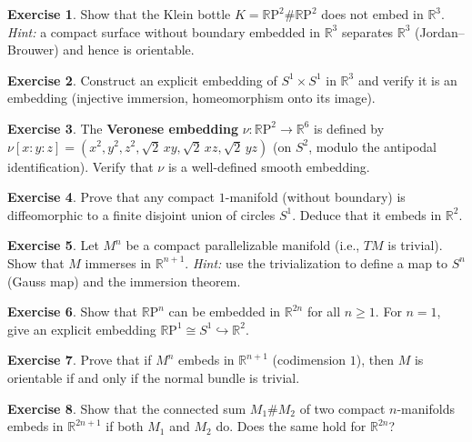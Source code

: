 \documentclass[12pt,a4paper,openany]{book}
\theoremstyle{definition}
\newtheorem{exercise}{Exercise}[chapter]
\theoremstyle{remark}
\newcommand{\R}{\mathbb{R}}
\newcommand{\RP}{\mathbb{R}\mathrm{P}}
\begin{document}
\begin{exercise}\label{exo:whitney-1}
Show that the Klein bottle $K = \RP^2 \# \RP^2$ does not embed in $\R^3$.
\emph{Hint:} a compact surface without boundary embedded in $\R^3$
separates $\R^3$ (Jordan--Brouwer) and hence is orientable.
\end{exercise}

\begin{exercise}\label{exo:whitney-2}
Construct an explicit embedding of $S^1 \times S^1$ in $\R^3$ and
verify it is an embedding (injective immersion, homeomorphism onto
its image).
\end{exercise}

\begin{exercise}\label{exo:whitney-3}
The \textbf{Veronese embedding} $\nu\colon \RP^2 \to \R^6$ is defined by
$\nu[x:y:z] = (x^2,y^2,z^2,\sqrt{2}\,xy,\sqrt{2}\,xz,\sqrt{2}\,yz)$
(on $S^2$, modulo the antipodal identification). Verify that $\nu$ is a
well-defined smooth embedding.
\end{exercise}

\begin{exercise}\label{exo:whitney-4}
Prove that any compact $1$-manifold (without boundary) is diffeomorphic
to a finite disjoint union of circles $S^1$. Deduce that it embeds in $\R^2$.
\end{exercise}

\begin{exercise}\label{exo:whitney-5}
Let $M^n$ be a compact parallelizable manifold (i.e., $TM$ is trivial).
Show that $M$ immerses in $\R^{n+1}$.
\emph{Hint:} use the trivialization to define a map to $S^n$
(Gauss map) and the immersion theorem.
\end{exercise}

\begin{exercise}\label{exo:whitney-6}
Show that $\RP^n$ can be embedded in $\R^{2n}$ for all $n\ge 1$.
For $n=1$, give an explicit embedding $\RP^1 \cong S^1 \hookrightarrow\R^2$.
\end{exercise}

\begin{exercise}\label{exo:whitney-7}
Prove that if $M^n$ embeds in $\R^{n+1}$ (codimension $1$), then $M$
is orientable if and only if the normal bundle is trivial.
\end{exercise}

\begin{exercise}\label{exo:whitney-8}
Show that the connected sum $M_1 \# M_2$ of two compact $n$-manifolds
embeds in $\R^{2n+1}$ if both $M_1$ and $M_2$ do. Does the same
hold for $\R^{2n}$?
\end{exercise}
\end{document}

